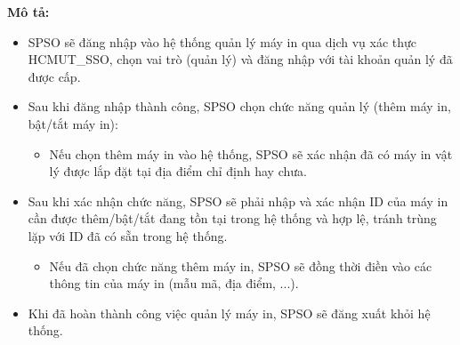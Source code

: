     \newpage
    \textbf{Mô tả:}
    \begin{itemize}
        \item SPSO sẽ đăng nhập vào hệ thống quản lý máy in qua dịch vụ xác thực HCMUT\_SSO, chọn vai trò (quản lý) và đăng nhập với tài khoản quản lý đã được cấp.
        \item Sau khi đăng nhập thành công, SPSO chọn chức năng quản lý (thêm máy in, bật/tắt máy in):
        \begin{itemize}
            \item Nếu chọn thêm máy in vào hệ thống, SPSO sẽ xác nhận đã có máy in vật lý được lắp đặt tại địa điểm chỉ định hay chưa.
        \end{itemize}
        \item Sau khi xác nhận chức năng, SPSO sẽ phải nhập và xác nhận ID của máy in cần được thêm/bật/tắt đang tồn tại trong hệ thống và hợp lệ, tránh trùng lặp với ID đã có sẵn trong hệ thống.
        \begin{itemize}
            \item Nếu đã chọn chức năng thêm máy in, SPSO sẽ đồng thời điền vào các thông tin của máy in (mẫu mã, địa điểm, ...).
        \end{itemize}
        \item Khi đã hoàn thành công việc quản lý máy in, SPSO sẽ đăng xuất khỏi hệ thống.
    \end{itemize}


    \newpage
